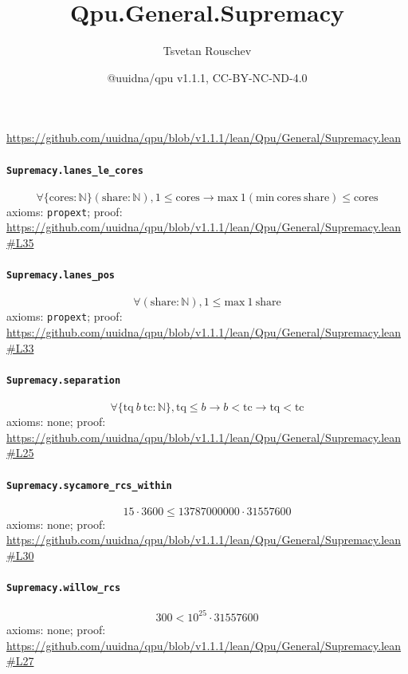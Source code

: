 \documentclass[11pt]{article}
\title{Qpu.General.Supremacy}
\author{Tsvetan Rouschev}
\date{@uuidna/qpu v1.1.1, CC-BY-NC-ND-4.0}
\begin{document}
\maketitle
\noindent\url{https://github.com/uuidna/qpu/blob/v1.1.1/lean/Qpu/General/Supremacy.lean}

\paragraph{\texttt{Supremacy.lanes\_le\_cores}}
\[ \forall \{\mathrm{cores} : \mathbb{N}\} (\mathrm{share} : \mathbb{N}), 1 \le \mathrm{cores} \to \mathrm{max}\ 1 (\mathrm{min}\ \mathrm{cores}\ \mathrm{share}) \le \mathrm{cores} \]
\noindent axioms: \texttt{propext}; proof: \url{https://github.com/uuidna/qpu/blob/v1.1.1/lean/Qpu/General/Supremacy.lean\#L35}

\paragraph{\texttt{Supremacy.lanes\_pos}}
\[ \forall (\mathrm{share} : \mathbb{N}), 1 \le \mathrm{max}\ 1\ \mathrm{share} \]
\noindent axioms: \texttt{propext}; proof: \url{https://github.com/uuidna/qpu/blob/v1.1.1/lean/Qpu/General/Supremacy.lean\#L33}

\paragraph{\texttt{Supremacy.separation}}
\[ \forall \{\mathrm{tq}\ b\ \mathrm{tc} : \mathbb{N}\}, \mathrm{tq} \le b \to b < \mathrm{tc} \to \mathrm{tq} < \mathrm{tc} \]
\noindent axioms: none; proof: \url{https://github.com/uuidna/qpu/blob/v1.1.1/lean/Qpu/General/Supremacy.lean\#L25}

\paragraph{\texttt{Supremacy.sycamore\_rcs\_within}}
\[ 15 \cdot 3600 \le 13787000000 \cdot 31557600 \]
\noindent axioms: none; proof: \url{https://github.com/uuidna/qpu/blob/v1.1.1/lean/Qpu/General/Supremacy.lean\#L30}

\paragraph{\texttt{Supremacy.willow\_rcs}}
\[ 300 < 10 ^{25} \cdot 31557600 \]
\noindent axioms: none; proof: \url{https://github.com/uuidna/qpu/blob/v1.1.1/lean/Qpu/General/Supremacy.lean\#L27}
\end{document}
